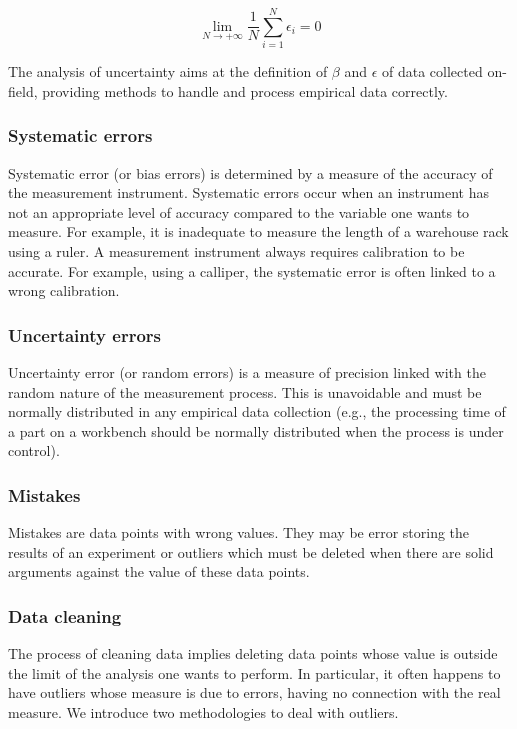 \begin{equation}
\lim_{N \to +\infty}{\frac{1}{N}\sum_{i=1}^{N}{\epsilon_i=0}}
\label{eq_measurement3}
\end{equation}

The analysis of uncertainty aims at the definition of $\beta$ and $\epsilon$ of data collected on-field, providing methods to handle and process empirical data correctly.

\subsubsection{Systematic errors}
Systematic error (or bias errors) is determined by a measure of the accuracy of the measurement instrument. Systematic errors occur when an instrument has not an appropriate level of accuracy compared to the variable one wants to measure. For example, it is inadequate to measure the length of a warehouse rack using a ruler. A measurement instrument always requires calibration to be accurate. For example, using a calliper, the systematic error is often linked to a wrong calibration. 

\subsubsection{Uncertainty errors}
Uncertainty error (or random errors) is a measure of precision linked with the random nature of the measurement process. This is unavoidable and must be normally distributed in any empirical data collection (e.g., the processing time of a part on a workbench should be normally distributed when the process is under control).

\subsubsection{Mistakes}
Mistakes are data points with wrong values. They may be error storing the results of an experiment or outliers which must be deleted when there are solid arguments against the value of these data points.

\subsubsection{Data cleaning}
The process of cleaning data implies deleting data points whose value is outside the limit of the analysis one wants to perform. In particular, it often happens to have outliers whose measure is due to errors, having no connection with the real measure. We introduce two methodologies to deal with outliers.\par

